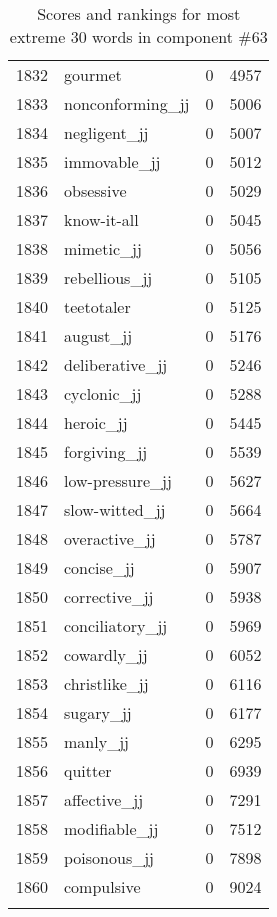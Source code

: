 \begin{longtable}[!htbp]{| rlr@{.}l |}
    1832 & gourmet & 0 & 4957 \\
    1833 & nonconforming\_jj & 0 & 5006 \\
    1834 & negligent\_jj & 0 & 5007 \\
    1835 & immovable\_jj & 0 & 5012 \\
    1836 & obsessive & 0 & 5029 \\
    1837 & know-it-all & 0 & 5045 \\
    1838 & mimetic\_jj & 0 & 5056 \\
    1839 & rebellious\_jj & 0 & 5105 \\
    1840 & teetotaler & 0 & 5125 \\
    1841 & august\_jj & 0 & 5176 \\
    1842 & deliberative\_jj & 0 & 5246 \\
    1843 & cyclonic\_jj & 0 & 5288 \\
    1844 & heroic\_jj & 0 & 5445 \\
    1845 & forgiving\_jj & 0 & 5539 \\
    1846 & low-pressure\_jj & 0 & 5627 \\
    1847 & slow-witted\_jj & 0 & 5664 \\
    1848 & overactive\_jj & 0 & 5787 \\
    1849 & concise\_jj & 0 & 5907 \\
    1850 & corrective\_jj & 0 & 5938 \\
    1851 & conciliatory\_jj & 0 & 5969 \\
    1852 & cowardly\_jj & 0 & 6052 \\
    1853 & christlike\_jj & 0 & 6116 \\
    1854 & sugary\_jj & 0 & 6177 \\
    1855 & manly\_jj & 0 & 6295 \\
    1856 & quitter & 0 & 6939 \\
    1857 & affective\_jj & 0 & 7291 \\
    1858 & modifiable\_jj & 0 & 7512 \\
    1859 & poisonous\_jj & 0 & 7898 \\
    1860 & compulsive & 0 & 9024 \\
    \hline
    \caption{Scores and rankings for most extreme 30 words in component \#63} \\
\end{longtable}
